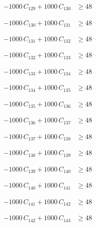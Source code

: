 \documentclass[a4paper,11pt]{article}
\begin{document}
\begin{align}
-1000\,C_{129} + 1000\,C_{130} &\geq 48 \nonumber
\end{align}

\begin{align}
-1000\,C_{130} + 1000\,C_{131} &\geq 48 \nonumber
\end{align}

\begin{align}
-1000\,C_{131} + 1000\,C_{132} &\geq 48 \nonumber
\end{align}

\begin{align}
-1000\,C_{132} + 1000\,C_{133} &\geq 48 \nonumber
\end{align}

\begin{align}
-1000\,C_{133} + 1000\,C_{134} &\geq 48 \nonumber
\end{align}

\begin{align}
-1000\,C_{134} + 1000\,C_{135} &\geq 48 \nonumber
\end{align}

\begin{align}
-1000\,C_{135} + 1000\,C_{136} &\geq 48 \nonumber
\end{align}

\begin{align}
-1000\,C_{136} + 1000\,C_{137} &\geq 48 \nonumber
\end{align}

\begin{align}
-1000\,C_{137} + 1000\,C_{138} &\geq 48 \nonumber
\end{align}

\begin{align}
-1000\,C_{138} + 1000\,C_{139} &\geq 48 \nonumber
\end{align}

\begin{align}
-1000\,C_{139} + 1000\,C_{140} &\geq 48 \nonumber
\end{align}

\begin{align}
-1000\,C_{140} + 1000\,C_{141} &\geq 48 \nonumber
\end{align}

\begin{align}
-1000\,C_{141} + 1000\,C_{142} &\geq 48 \nonumber
\end{align}

\begin{align}
-1000\,C_{142} + 1000\,C_{143} &\geq 48 \nonumber
\end{align}
\end{document}
